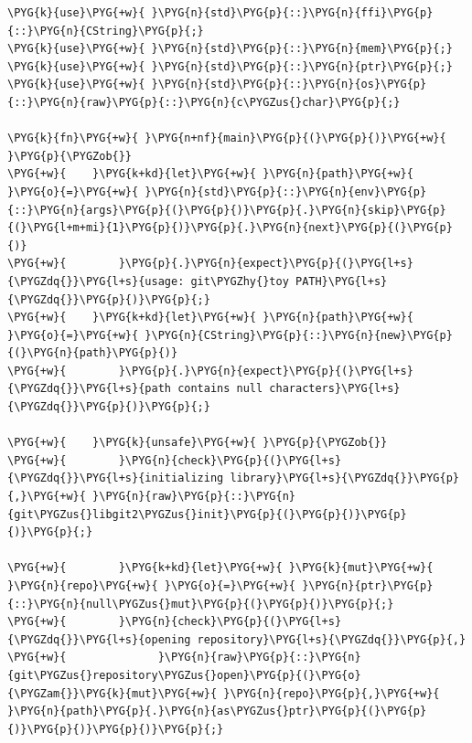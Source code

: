 \begin{Verbatim}[commandchars=\\\{\},breaklines=true,breakanywhere=true,fontsize=\codefont,xleftmargin=17bp]
\PYG{k}{use}\PYG{+w}{ }\PYG{n}{std}\PYG{p}{::}\PYG{n}{ffi}\PYG{p}{::}\PYG{n}{CString}\PYG{p}{;}
\PYG{k}{use}\PYG{+w}{ }\PYG{n}{std}\PYG{p}{::}\PYG{n}{mem}\PYG{p}{;}
\PYG{k}{use}\PYG{+w}{ }\PYG{n}{std}\PYG{p}{::}\PYG{n}{ptr}\PYG{p}{;}
\PYG{k}{use}\PYG{+w}{ }\PYG{n}{std}\PYG{p}{::}\PYG{n}{os}\PYG{p}{::}\PYG{n}{raw}\PYG{p}{::}\PYG{n}{c\PYGZus{}char}\PYG{p}{;}

\PYG{k}{fn}\PYG{+w}{ }\PYG{n+nf}{main}\PYG{p}{(}\PYG{p}{)}\PYG{+w}{ }\PYG{p}{\PYGZob{}}
\PYG{+w}{    }\PYG{k+kd}{let}\PYG{+w}{ }\PYG{n}{path}\PYG{+w}{ }\PYG{o}{=}\PYG{+w}{ }\PYG{n}{std}\PYG{p}{::}\PYG{n}{env}\PYG{p}{::}\PYG{n}{args}\PYG{p}{(}\PYG{p}{)}\PYG{p}{.}\PYG{n}{skip}\PYG{p}{(}\PYG{l+m+mi}{1}\PYG{p}{)}\PYG{p}{.}\PYG{n}{next}\PYG{p}{(}\PYG{p}{)}
\PYG{+w}{        }\PYG{p}{.}\PYG{n}{expect}\PYG{p}{(}\PYG{l+s}{\PYGZdq{}}\PYG{l+s}{usage: git\PYGZhy{}toy PATH}\PYG{l+s}{\PYGZdq{}}\PYG{p}{)}\PYG{p}{;}
\PYG{+w}{    }\PYG{k+kd}{let}\PYG{+w}{ }\PYG{n}{path}\PYG{+w}{ }\PYG{o}{=}\PYG{+w}{ }\PYG{n}{CString}\PYG{p}{::}\PYG{n}{new}\PYG{p}{(}\PYG{n}{path}\PYG{p}{)}
\PYG{+w}{        }\PYG{p}{.}\PYG{n}{expect}\PYG{p}{(}\PYG{l+s}{\PYGZdq{}}\PYG{l+s}{path contains null characters}\PYG{l+s}{\PYGZdq{}}\PYG{p}{)}\PYG{p}{;}

\PYG{+w}{    }\PYG{k}{unsafe}\PYG{+w}{ }\PYG{p}{\PYGZob{}}
\PYG{+w}{        }\PYG{n}{check}\PYG{p}{(}\PYG{l+s}{\PYGZdq{}}\PYG{l+s}{initializing library}\PYG{l+s}{\PYGZdq{}}\PYG{p}{,}\PYG{+w}{ }\PYG{n}{raw}\PYG{p}{::}\PYG{n}{git\PYGZus{}libgit2\PYGZus{}init}\PYG{p}{(}\PYG{p}{)}\PYG{p}{)}\PYG{p}{;}

\PYG{+w}{        }\PYG{k+kd}{let}\PYG{+w}{ }\PYG{k}{mut}\PYG{+w}{ }\PYG{n}{repo}\PYG{+w}{ }\PYG{o}{=}\PYG{+w}{ }\PYG{n}{ptr}\PYG{p}{::}\PYG{n}{null\PYGZus{}mut}\PYG{p}{(}\PYG{p}{)}\PYG{p}{;}
\PYG{+w}{        }\PYG{n}{check}\PYG{p}{(}\PYG{l+s}{\PYGZdq{}}\PYG{l+s}{opening repository}\PYG{l+s}{\PYGZdq{}}\PYG{p}{,}
\PYG{+w}{              }\PYG{n}{raw}\PYG{p}{::}\PYG{n}{git\PYGZus{}repository\PYGZus{}open}\PYG{p}{(}\PYG{o}{\PYGZam{}}\PYG{k}{mut}\PYG{+w}{ }\PYG{n}{repo}\PYG{p}{,}\PYG{+w}{ }\PYG{n}{path}\PYG{p}{.}\PYG{n}{as\PYGZus{}ptr}\PYG{p}{(}\PYG{p}{)}\PYG{p}{)}\PYG{p}{)}\PYG{p}{;}


\end{Verbatim}
